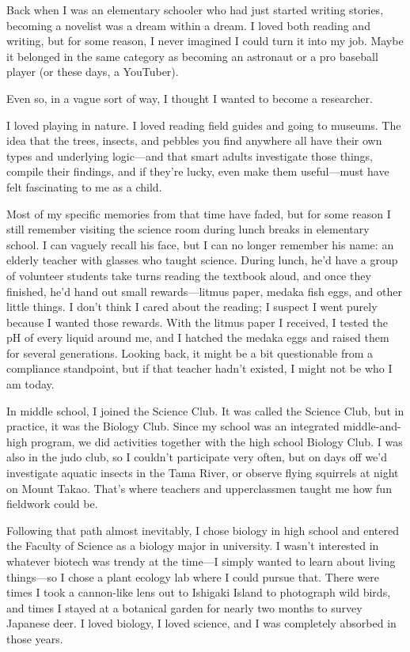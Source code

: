 \documentclass[
    a4paper,
    12pt,
    twoside,
    openany,
    UTF8,
    fontset=windows
]{ctexbook}
\begin{document}
Back when I was an elementary schooler who had just started writing stories, becoming a novelist was a dream within a dream. I loved both reading and writing, but for some reason, I never imagined I could turn it into my job. Maybe it belonged in the same category as becoming an astronaut or a pro baseball player (or these days, a YouTuber).

Even so, in a vague sort of way, I thought I wanted to become a researcher.

I loved playing in nature. I loved reading field guides and going to museums. The idea that the trees, insects, and pebbles you find anywhere all have their own types and underlying logic---and that smart adults investigate those things, compile their findings, and if they're lucky, even make them useful---must have felt fascinating to me as a child.

Most of my specific memories from that time have faded, but for some reason I still remember visiting the science room during lunch breaks in elementary school. I can vaguely recall his face, but I can no longer remember his name: an elderly teacher with glasses who taught science. During lunch, he'd have a group of volunteer students take turns reading the textbook aloud, and once they finished, he'd hand out small rewards---litmus paper, medaka fish eggs, and other little things. I don't think I cared about the reading; I suspect I went purely because I wanted those rewards. With the litmus paper I received, I tested the pH of every liquid around me, and I hatched the medaka eggs and raised them for several generations. Looking back, it might be a bit questionable from a compliance standpoint, but if that teacher hadn't existed, I might not be who I am today.

In middle school, I joined the Science Club. It was called the Science Club, but in practice, it was the Biology Club. Since my school was an integrated middle-and-high program, we did activities together with the high school Biology Club. I was also in the judo club, so I couldn't participate very often, but on days off we'd investigate aquatic insects in the Tama River, or observe flying squirrels at night on Mount Takao. That's where teachers and upperclassmen taught me how fun fieldwork could be.

Following that path almost inevitably, I chose biology in high school and entered the Faculty of Science as a biology major in university. I wasn't interested in whatever biotech was trendy at the time---I simply wanted to learn about living things---so I chose a plant ecology lab where I could pursue that. There were times I took a cannon-like lens out to Ishigaki Island to photograph wild birds, and times I stayed at a botanical garden for nearly two months to survey Japanese deer. I loved biology, I loved science, and I was completely absorbed in those years.
\end{document}
